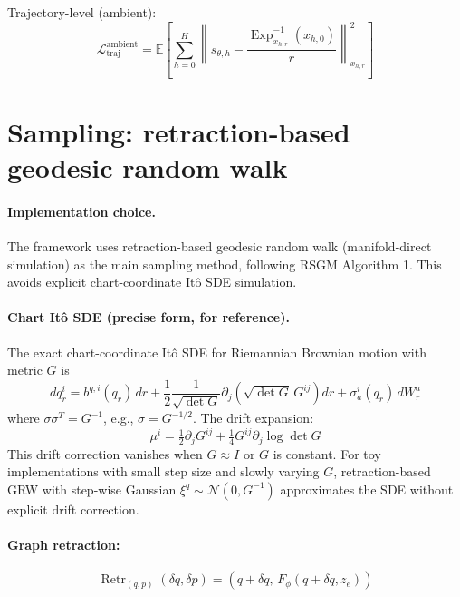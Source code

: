 \documentclass[11pt,a4paper]{article}
\DeclareMathOperator{\Exp}{Exp}
\DeclareMathOperator{\Retr}{Retr}
\newcommand{\E}{\mathbb{E}}
\newcommand{\N}{\mathcal{N}}
\newcommand{\Loss}{\mathcal{L}}
\begin{document}
Trajectory-level (ambient):
\begin{equation}
\Loss_{\text{traj}}^{\text{ambient}} = \E \left[ \sum_{h=0}^{H} \left\| s_{\theta, h} - \frac{\Exp_{x_{h, r}}^{-1}(x_{h, 0})}{r} \right\|^2_{x_{h, r}} \right]
\end{equation}

\section{Sampling: retraction-based geodesic random walk}

\paragraph{Implementation choice.} The framework uses retraction-based geodesic random walk (manifold-direct simulation) as the main sampling method, following RSGM Algorithm 1. This avoids explicit chart-coordinate It\^o SDE simulation.

\paragraph{Chart It\^o SDE (precise form, for reference).} The exact chart-coordinate It\^o SDE for Riemannian Brownian motion with metric $G$ is
\begin{equation}
dq^i_r = b^{q, i}(q_r) \, dr + \frac{1}{2} \frac{1}{\sqrt{\det G}} \partial_j \left( \sqrt{\det G} \, G^{ij} \right) dr + \sigma^i_a(q_r) \, dW^a_r
\end{equation}
where $\sigma \sigma^T = G^{-1}$, e.g., $\sigma = G^{-1/2}$. The drift expansion:
\begin{equation}
\mu^i = \tfrac{1}{2} \partial_j G^{ij} + \tfrac{1}{4} G^{ij} \partial_j \log \det G
\end{equation}
This drift correction vanishes when $G \approx I$ or $G$ is constant. For toy implementations with small step size and slowly varying $G$, retraction-based GRW with step-wise Gaussian $\xi^q \sim \N(0, G^{-1})$ approximates the SDE without explicit drift correction.

\paragraph{Graph retraction:}
\begin{equation}
\Retr_{(q, p)}(\delta q, \delta p) = (q + \delta q, \, F_\phi(q + \delta q, z_e))
\end{equation}
\end{document}
